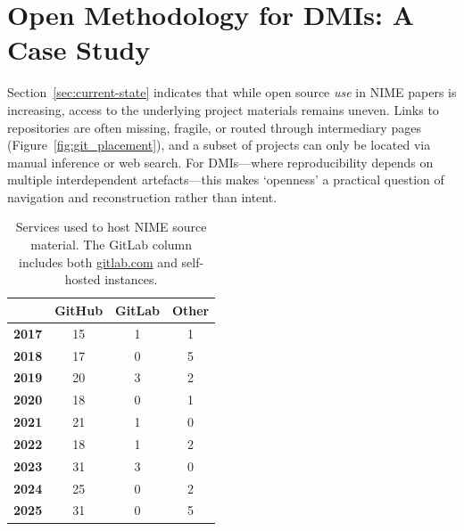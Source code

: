 \section{Open Methodology for DMIs: A Case Study}\label{sec:DMI}

Section~\ref{sec:current-state} indicates that while open source \emph{use} in NIME papers is increasing, access to the underlying project materials remains uneven. Links to repositories are often missing, fragile, or routed through intermediary pages (Figure~\ref{fig:git_placement}), and a subset of projects can only be located via manual inference or web search. For DMIs---where reproducibility depends on multiple interdependent artefacts---this makes `openness' a practical question of navigation and reconstruction rather than intent.

\begin{table}
    \centering
    \begin{tabular}{r|ccc}
                      & \textbf{GitHub} & \textbf{GitLab} & \textbf{Other} \\ \hline
        \textbf{2017} & 15              & 1               & 1              \\
        \textbf{2018} & 17              & 0               & 5              \\
        \textbf{2019} & 20              & 3               & 2              \\
        \textbf{2020} & 18              & 0               & 1              \\
        \textbf{2021} & 21              & 1               & 0              \\
        \textbf{2022} & 18              & 1               & 2              \\
        \textbf{2023} & 31              & 3               & 0              \\
        \textbf{2024} & 25              & 0               & 2              \\
        \textbf{2025} & 31              & 0               & 5              \\
    \end{tabular}
    \caption{Services used to host NIME source material. The GitLab column includes both \url{gitlab.com} and self-hosted instances.}
    \label{tab:git_type}
\end{table}


